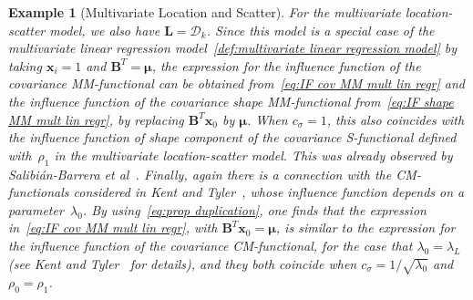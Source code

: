 \documentclass{article}
\numberwithin{equation}{section}
\theoremstyle{plain}
\newtheorem{example}{Example}
\newcommand{\bmu}{\bm\mu}
\newcommand{\bx}{\mathbf{x}}
\newcommand{\bB}{\mathbf{B}}
\newcommand{\bL}{\mathbf{L}}
\begin{document}
\begin{example}[Multivariate Location and Scatter]
For the multivariate location-scatter model, we also have $\bL=\mathcal{D}_k$.
Since this model is a special case of the multivariate linear regression model~\eqref{def:multivariate linear regression model}
by taking $\bx_i=1$ and $\bB^T=\bmu$,
the expression for the influence function of the covariance MM-functional can 
be obtained from~\eqref{eq:IF cov MM mult lin regr}
and the influence function of the covariance shape MM-functional from~\eqref{eq:IF shape MM mult lin regr},
by replacing $\bB^T\bx_0$ by $\bmu$.
When $c_\sigma=1$, this also coincides with the influence function of
shape component of the covariance S-functional defined with~$\rho_1$ in the multivariate location-scatter model.
This was already observed by Salibi\'an-Barrera \emph{et al}~\cite{SalibianBarrera-VanAelst-Willems2006}.
Finally, again there is a connection with the CM-functionals considered in Kent and Tyler~\cite{kent&tyler1996},
whose influence function depends on a parameter~$\lambda_0$.
By using~\eqref{eq:prop duplication}, one finds that the expression in~\eqref{eq:IF cov MM mult lin regr},
with $\bB^T\bx_0=\bmu$,
is similar to the expression for the influence function of the covariance CM-functional,
for the case that $\lambda_0=\lambda_L$ (see Kent and Tyler~\cite{kent&tyler1996} for details),
and they both coincide when $c_\sigma=1/\sqrt{\lambda_0}$ and $\rho_0=\rho_1$.
\end{example}
\end{document}
